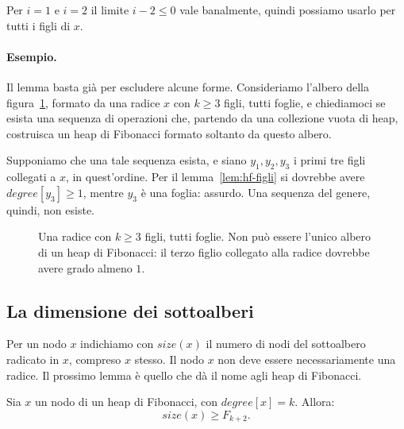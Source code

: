 Per $i = 1$ e $i = 2$ il limite $i - 2 \le 0$ vale banalmente, quindi possiamo usarlo per tutti i figli di $x$.

\paragraph{Esempio.}
Il lemma basta già per escludere alcune forme. Consideriamo l'albero della figura~\ref{fig:hf-stella}, formato da una radice $x$ con $k \ge 3$ figli, tutti foglie, e chiediamoci se esista una sequenza di operazioni che, partendo da una collezione vuota di heap, costruisca un heap di Fibonacci formato soltanto da questo albero.

Supponiamo che una tale sequenza esista, e siano $y_1, y_2, y_3$ i primi tre figli collegati a $x$, in quest'ordine. Per il lemma~\ref{lem:hf-figli} si dovrebbe avere $\mathit{degree}[y_3] \ge 1$, mentre $y_3$ è una foglia: assurdo. Una sequenza del genere, quindi, non esiste.

\begin{figure}[htbp]
\centering
{}
\caption{Una radice con $k \ge 3$ figli, tutti foglie. Non può essere l'unico albero di un heap di Fibonacci: il terzo figlio collegato alla radice dovrebbe avere grado almeno $1$.}
\label{fig:hf-stella}
\end{figure}

\subsection{La dimensione dei sottoalberi}\label{sec:hf-size}
Per un nodo $x$ indichiamo con $\mathit{size}(x)$ il numero di nodi del sottoalbero radicato in $x$, compreso $x$ stesso. Il nodo $x$ non deve essere necessariamente una radice. Il prossimo lemma è quello che dà il nome agli heap di Fibonacci.

\begin{lemma}\label{lem:hf-size}
Sia $x$ un nodo di un heap di Fibonacci, con $\mathit{degree}[x] = k$. Allora:
\[
\mathit{size}(x) \ge F_{k+2}.
\]
\end{lemma}

